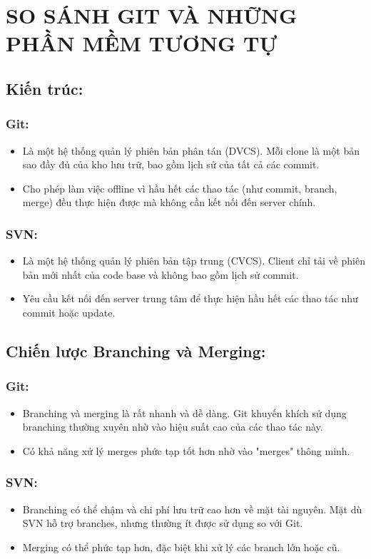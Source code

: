 \chapter{SO SÁNH GIT VÀ NHỮNG PHẦN MỀM TƯƠNG TỰ}
\section{Kiến trúc:}
\subsection{Git:}
\begin{itemize}
    \item Là một hệ thống quản lý phiên bản phân tán (DVCS). Mỗi clone là một bản sao đầy đủ của kho lưu trữ, bao gồm lịch sử của tất cả các commit.
    \item Cho phép làm việc offline vì hầu hết các thao tác (như commit, branch, merge) đều thực hiện được mà không cần kết nối đến server chính.
\end{itemize}

\subsection{SVN:}
\begin{itemize}
    \item Là một hệ thống quản lý phiên bản tập trung (CVCS). Client chỉ tải về phiên bản mới nhất của code base và không bao gồm lịch sử commit.
    \item Yêu cầu kết nối đến server trung tâm để thực hiện hầu hết các thao tác như commit hoặc update.
\end{itemize}

\section{Chiến lược Branching và Merging:}
\subsection{Git:}
\begin{itemize}
    \item Branching và merging là rất nhanh và dễ dàng. Git khuyến khích sử dụng branching thường xuyên nhờ vào hiệu suất cao của các thao tác này.
    \item Có khả năng xử lý merges phức tạp tốt hơn nhờ vào "merges" thông minh.
\end{itemize}

\subsection{SVN:}
\begin{itemize}
    \item Branching có thể chậm và chi phí lưu trữ cao hơn về mặt tài nguyên. Mặt dù SVN hỗ trợ branches, nhưng thường ít được sử dụng so với Git.
    \item Merging có thể phức tạp hơn, đặc biệt khi xử lý các branch lớn hoặc cũ.
\end{itemize}

